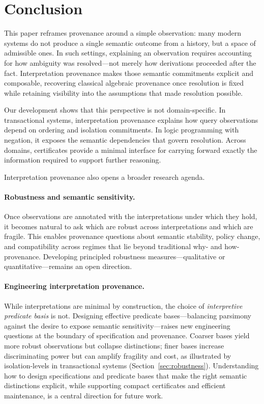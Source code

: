 \documentclass[acmsmall,nonacm]{acmart}
\theoremstyle{remark}
\numberwithin{definition}{section}
\numberwithin{theorem}{section}
\numberwithin{lemma}{section}
\numberwithin{corollary}{section}
\numberwithin{remark}{section}
\numberwithin{example}{section}
\numberwithin{observation}{section}
\numberwithin{assumption}{section}
\begin{document}
\section{Conclusion}
\label{sec:conclusion}

This paper reframes provenance around a simple observation: many modern systems do
not produce a single semantic outcome from a history, but a space of admissible
ones.
In such settings, explaining an observation requires accounting for how ambiguity
was resolved—not merely how derivations proceeded after the fact.
Interpretation provenance makes those semantic commitments explicit and
composable, recovering classical algebraic provenance once resolution is fixed
while retaining visibility into the assumptions that made resolution possible.

Our development shows that this perspective is not domain-specific.
In transactional systems, interpretation provenance explains how query
observations depend on ordering and isolation commitments.
In logic programming with negation, it exposes the semantic dependencies that
govern resolution.
Across domains, certificates provide a minimal interface for carrying forward
exactly the information required to support further reasoning.

Interpretation provenance also opens a broader research agenda.

\paragraph{Robustness and semantic sensitivity.}
Once observations are annotated with the interpretations under which they hold, it
becomes natural to ask which are robust across interpretations and which are
fragile.
This enables provenance questions about semantic stability, policy change, and
compatibility across regimes that lie beyond traditional why- and how-provenance.
Developing principled robustness measures—qualitative or quantitative—remains an
open direction.

\paragraph{Engineering interpretation provenance.}
While interpretations are minimal by construction, the choice of
\emph{interpretive predicate basis} is not.
Designing effective predicate bases—balancing parsimony against the desire to
expose semantic sensitivity—raises new engineering questions at the boundary of
specification and provenance.
Coarser bases yield more robust observations but collapse distinctions; finer
bases increase discriminating power but can amplify fragility and cost, as
illustrated by isolation-levels in transactional systems (Section~\ref{sec:robustness}).
Understanding how to design specifications and predicate bases that make the
right semantic distinctions explicit, while supporting compact certificates and
efficient maintenance, is a central direction for future work.
\end{document}
